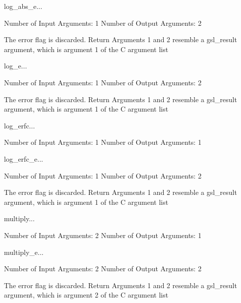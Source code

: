 \begin{funcdesc}{log_abs_e}{...}

    Number of Input  Arguments:  1
    Number of Output Arguments:  2

The error flag is discarded.
Return Arguments 1 and 2 resemble a gsl_result argument,
	which is  argument 1 of the C argument list

\end{funcdesc}

\begin{funcdesc}{log_e}{...}

    Number of Input  Arguments:  1
    Number of Output Arguments:  2

The error flag is discarded.
Return Arguments 1 and 2 resemble a gsl_result argument,
	which is  argument 1 of the C argument list

\end{funcdesc}

\begin{funcdesc}{log_erfc}{...}

    Number of Input  Arguments:  1
    Number of Output Arguments:  1
\end{funcdesc}

\begin{funcdesc}{log_erfc_e}{...}

    Number of Input  Arguments:  1
    Number of Output Arguments:  2

The error flag is discarded.
Return Arguments 1 and 2 resemble a gsl_result argument,
	which is  argument 1 of the C argument list

\end{funcdesc}

\begin{funcdesc}{multiply}{...}

    Number of Input  Arguments:  2
    Number of Output Arguments:  1
\end{funcdesc}

\begin{funcdesc}{multiply_e}{...}

    Number of Input  Arguments:  2
    Number of Output Arguments:  2

The error flag is discarded.
Return Arguments 1 and 2 resemble a gsl_result argument,
	which is  argument 2 of the C argument list

\end{funcdesc}

